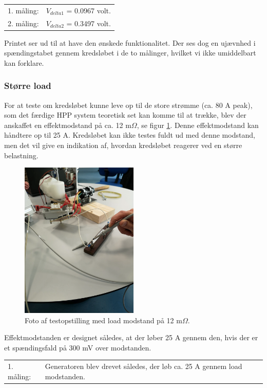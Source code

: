 \begin{tabular}{p{2cm}l}
  1. måling: &$V_{delta1}$ = 0.0967 volt.\\
  2. måling: &$V_{delta2}$ = 0.3497 volt.\\
\end{tabular}

Printet ser ud til at have den ønskede funktionalitet. Der ses dog en ujævnhed i spændingstabet gennem kredsløbet i de to målinger, hvilket vi ikke umiddelbart kan forklare.


\subsubsection{Større load}
\label{sec:storre-load}

For at teste om kredsløbet kunne leve op til de store strømme (ca. 80 A peak), som det færdige HPP system teoretisk set kan komme til at trække, blev der anskaffet en effektmodstand på ca. 12 m$\Omega$, se figur \ref{fig:nt7}. Denne effektmodstand kan håndtere op til 25 A. Kredsløbet kan ikke testes fuldt ud med denne modstand, men det vil give en indikation af, hvordan kredsløbet reagerer ved en større belastning.
\clearpage
\begin{figure}[h]
  \centering
  \includegraphics[width=0.5\textwidth]{./figurer/nt7.png}
  \caption{Foto af testopstilling med load modstand på 12 m$\Omega$.}
  \label{fig:nt7}
\end{figure}

Effektmodstanden er designet således, at der løber 25 A gennem den, hvis der er et spændingsfald på 300 mV over modstanden.

\begin{tabular}{p{2cm}l}
  1. måling: &Generatoren blev drevet således, der løb ca. 25 A gennem load modstanden.\\
\end{tabular}

